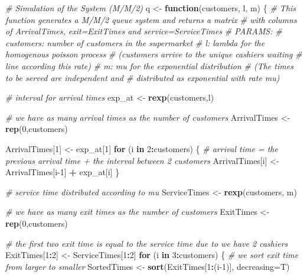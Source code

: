 \documentclass[]{article}
\newenvironment{Shaded}{\begin{snugshade}}{\end{snugshade}}
\newcommand{\CommentTok}[1]{\textcolor[rgb]{0.56,0.35,0.01}{\textit{#1}}}
\newcommand{\ControlFlowTok}[1]{\textcolor[rgb]{0.13,0.29,0.53}{\textbf{#1}}}
\newcommand{\DataTypeTok}[1]{\textcolor[rgb]{0.13,0.29,0.53}{#1}}
\newcommand{\DecValTok}[1]{\textcolor[rgb]{0.00,0.00,0.81}{#1}}
\newcommand{\KeywordTok}[1]{\textcolor[rgb]{0.13,0.29,0.53}{\textbf{#1}}}
\newcommand{\NormalTok}[1]{#1}
\newcommand{\OperatorTok}[1]{\textcolor[rgb]{0.81,0.36,0.00}{\textbf{#1}}}
\newcommand{\StringTok}[1]{\textcolor[rgb]{0.31,0.60,0.02}{#1}}
\begin{document}
\begin{Shaded}
\begin{Highlighting}[]
\CommentTok{# Simulation of the System (M/M/2)}
\NormalTok{q <-}\StringTok{ }\ControlFlowTok{function}\NormalTok{(customers, l, m) \{}
  \CommentTok{# This function generates a M/M/2 queue system and returns a matrix }
  \CommentTok{# with columns of ArrivalTimes, exit=ExitTimes and service=ServiceTimes}
  \CommentTok{# PARAMS:}
  \CommentTok{# customers:   number of customers in the supermarket}
  \CommentTok{# l:     lambda for the homogenous poisson process }
  \CommentTok{#    (customers arrive to the unique cashiers waiting}
  \CommentTok{#    line according this rate)}
  \CommentTok{# m:     mu for the exponential distribution}
  \CommentTok{#    (The times to be served are independent and }
  \CommentTok{#    distributed as exponential with rate mu)}

  \CommentTok{# interval for arrival times}
\NormalTok{  exp_at <-}\StringTok{ }\KeywordTok{rexp}\NormalTok{(customers,l)}
  
  \CommentTok{# we have as many arrival times as the number of customers}
\NormalTok{  ArrivalTimes <-}\StringTok{ }\KeywordTok{rep}\NormalTok{(}\DecValTok{0}\NormalTok{,customers) }

\NormalTok{  ArrivalTimes[}\DecValTok{1}\NormalTok{] <-}\StringTok{ }\NormalTok{exp_at[}\DecValTok{1}\NormalTok{]}
  \ControlFlowTok{for}\NormalTok{ (i }\ControlFlowTok{in} \DecValTok{2}\OperatorTok{:}\NormalTok{customers) \{}
    \CommentTok{# arrival time = the previous arrival time + the interval between 2 customers}
\NormalTok{    ArrivalTimes[i] <-}\StringTok{ }\NormalTok{ArrivalTimes[i}\DecValTok{-1}\NormalTok{] }\OperatorTok{+}\StringTok{ }\NormalTok{exp_at[i]}
\NormalTok{  \} }
  
  \CommentTok{# service time distributed according to mu}
\NormalTok{  ServiceTimes <-}\StringTok{ }\KeywordTok{rexp}\NormalTok{(customers, m)}
  
  \CommentTok{# we have as many exit times as the number of customers}
\NormalTok{  ExitTimes <-}\StringTok{ }\KeywordTok{rep}\NormalTok{(}\DecValTok{0}\NormalTok{,customers)}
  
  \CommentTok{# the first two exit time is equal to the service time due to we have 2 cashiers}
\NormalTok{  ExitTimes[}\DecValTok{1}\OperatorTok{:}\DecValTok{2}\NormalTok{] <-}\StringTok{ }\NormalTok{ServiceTimes[}\DecValTok{1}\OperatorTok{:}\DecValTok{2}\NormalTok{]}
  \ControlFlowTok{for}\NormalTok{ (i }\ControlFlowTok{in} \DecValTok{3}\OperatorTok{:}\NormalTok{customers) \{}
    \CommentTok{# we sort exit time from larger to smaller}
\NormalTok{    SortedTimes <-}\StringTok{ }\KeywordTok{sort}\NormalTok{(ExitTimes[}\DecValTok{1}\OperatorTok{:}\NormalTok{(i}\DecValTok{-1}\NormalTok{)], }\DataTypeTok{decreasing=}\NormalTok{T)}
    

\end{Highlighting}
\end{Shaded}
\end{document}
